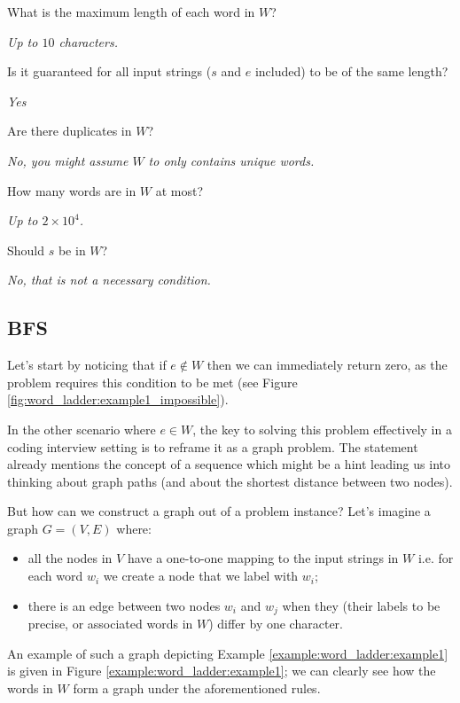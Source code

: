 \begin{QandA}
    \item What is the maximum length of each word in $W$?
    \begin{answered}
        \textit{Up to $10$ characters.}
    \end{answered}
    
    \item Is it guaranteed for all input strings ($s$ and $e$ included) to be of the same length?
    \begin{answered}
        \textit{Yes}
    \end{answered}

    \item Are there duplicates in $W$?
    \begin{answered}
        \textit{No, you might assume $W$ to only contains unique words.}
    \end{answered}

    \item How many words are in $W$ at most?
    \begin{answered}
        \textit{Up to $2\times 10^4$.}
    \end{answered}

    \item Should $s$ be in $W$?
    \begin{answered}
        \textit{No, that is not a necessary condition.}
    \end{answered}

\end{QandA}



\subsection{BFS}
\label{word_ladder:sec:bruteforce}
Let's start by noticing that if $e \notin W$ then we can immediately return zero, as the problem requires this condition to be met (see Figure \ref{fig:word_ladder:example1_impossible}).

In the other scenario where $e \in W$, the key to solving this problem effectively in a coding interview setting is to reframe it as a graph problem. 
The statement already mentions the concept of a sequence which might be a hint leading us into thinking about graph paths (and about the shortest distance between two nodes).

But how can we construct a graph out of a problem instance?
Let's imagine a graph $G=(V,E)$ where:
\begin{itemize}
    \item all the nodes in $V$ have a one-to-one mapping to the input strings in $W$ i.e. for each word $w_i$ we create a node that we label with $w_i$;
    \item there is an edge between two nodes $w_i$ and $w_j$ when they (their labels to be precise, or associated words in $W$) differ by one character.
\end{itemize}
An example of such a graph depicting Example \ref{example:word_ladder:example1} is given in Figure \ref{example:word_ladder:example1}; we can clearly see how the words in $W$ form a graph under the aforementioned rules.

